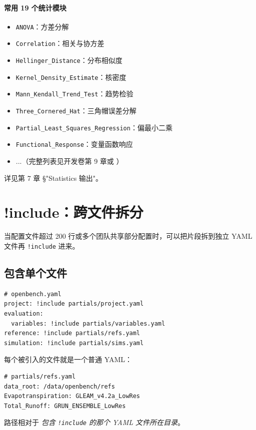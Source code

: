 \paragraph{常用 19 个统计模块}

\begin{itemize}
  \item \texttt{ANOVA}：方差分解
  \item \texttt{Correlation}：相关与协方差
  \item \texttt{Hellinger\_Distance}：分布相似度
  \item \texttt{Kernel\_Density\_Estimate}：核密度
  \item \texttt{Mann\_Kendall\_Trend\_Test}：趋势检验
  \item \texttt{Three\_Cornered\_Hat}：三角帽误差分解
  \item \texttt{Partial\_Least\_Squares\_Regression}：偏最小二乘
  \item \texttt{Functional\_Response}：变量函数响应
  \item ...（完整列表见开发卷第 9 章或 ）
\end{itemize}

详见第 7 章 §"Statistics 输出"。

\section{!include：跨文件拆分}

当配置文件超过 200 行或多个团队共享部分配置时，可以把片段拆到独立 YAML 文件再 \texttt{!include} 进来。

\subsection{包含单个文件}

\begin{verbatim}
# openbench.yaml
project: !include partials/project.yaml
evaluation:
  variables: !include partials/variables.yaml
reference: !include partials/refs.yaml
simulation: !include partials/sims.yaml
\end{verbatim}

每个被引入的文件就是一个普通 YAML：

\begin{verbatim}
# partials/refs.yaml
data_root: /data/openbench/refs
Evapotranspiration: GLEAM_v4.2a_LowRes
Total_Runoff: GRUN_ENSEMBLE_LowRes
\end{verbatim}

路径相对于 \emph{包含 \texttt{!include} 的那个 YAML 文件所在目录}。

